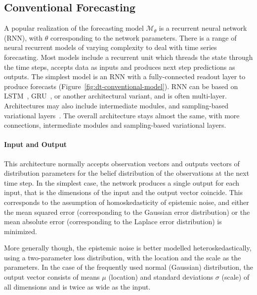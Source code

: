 \documentclass[runningheads]{llncs}
\begin{document}
\subsection{Conventional Forecasting}

A popular realization of the forecasting model
$\mathcal{M}_\theta$ is a recurrent neural network (RNN), with
$\theta$ corresponding to the network parameters.  There is a
range of neural recurrent models of varying complexity to deal
with time series forecasting. Most models include a recurrent
unit which threads the state through the time steps, accepts
data as inputs and produces next step predictions as outputs.
The simplest model is an RNN with a fully-connected readout
layer to produce forecasts
(Figure~\ref{fig:dt-conventional-model}).  RNN can be based on
LSTM~\cite{HS97}, GRU~\cite{CMB+14}, or another architectural variant, and
is often multi-layer.  Architectures  may also include
intermediate modules, and sampling-based variational
layers~\cite{CKD+15,YB21}. The overall architecture stays almost
the same, with more connections, intermediate modules and
sampling-based variational layers.

\paragraph{Input and Output} This architecture normally accepts
observation vectors and outputs vectors of distribution
parameters for the belief distribution of the observations at
the next time step. In the simplest case, the network produces a 
single output for each input, that is the dimensions of the
input and the output vector coincide. This corresponds to the
assumption of homoskedasticity of epistemic noise, and either
the mean squared error (corresponding to the Gaussian error
distribution) or the mean absolute error (corresponding to the
Laplace error distribution) is minimized. 

More generally though, the epistemic noise is better modelled
heteroskedastically, using a two-parameter loss distribution,
with the location and the scale as the parameters.
In the case of the frequently used normal (Gaussian)
distribution, the output vector consists of means $\mu$
(location) and standard deviations $\sigma$ (scale) of all
dimensions and is twice as wide as the input.
\end{document}
